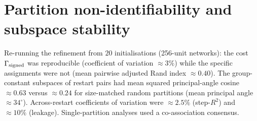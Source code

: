 \documentclass[11pt]{article}
\begin{document}
\section{Partition non-identifiability and subspace stability}
\label{sec:nonident}
Re-running the refinement from $20$ initialisations (256-unit networks): the cost
$\Gamma_{\rm signed}$ was reproducible (coefficient of variation $\approx3\%$) while the specific
assignments were not (mean pairwise adjusted Rand index $\approx0.40$). The group-constant
subspaces of restart pairs had mean squared principal-angle cosine $\approx0.63$ versus
$\approx0.24$ for size-matched random partitions (mean principal angle $\approx34^{\circ}$).
Across-restart coefficients of variation were $\approx2.5\%$ (step-$R^{2}$) and $\approx10\%$
(leakage). Single-partition analyses used a co-association consensus.
\end{document}
